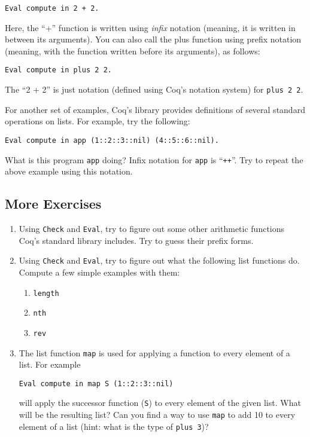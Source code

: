\documentclass{book}[12pt]
\begin{document}
\begin{verbatim}
Eval compute in 2 + 2.
\end{verbatim}

\noindent Here, the ``+'' function is written using \emph{infix}
notation (meaning, it is written in between its arguments).  You can
also call the plus function using prefix notation (meaning, with the
function written before its arguments), as follows:

\begin{verbatim}
Eval compute in plus 2 2.
\end{verbatim}

\noindent The ``2 + 2'' is just notation (defined using Coq's notation
system) for \texttt{plus 2 2}.

\noindent For another set of examples, Coq's library provides definitions
of several standard operations on lists.  For example, try the following:

\begin{verbatim}
Eval compute in app (1::2::3::nil) (4::5::6::nil).
\end{verbatim}

\noindent What is this program \texttt{app} doing?  Infix notation for
\texttt{app} is ``\texttt{++}''.  Try to repeat the above example
using this notation.

\subsection{More Exercises}

\begin{enumerate}
\item Using \texttt{Check} and \texttt{Eval}, try to figure out some
other arithmetic functions Coq's standard library includes.  Try to
guess their prefix forms.

\item Using \texttt{Check} and \texttt{Eval}, try to figure out what
the following list functions do.  Compute a few simple examples with
them:
\begin{enumerate}
\item \texttt{length}
\item \texttt{nth}
\item \texttt{rev}
\end{enumerate}
\item The list function \texttt{map} is used for applying a function
to every element of a list.  For example

\begin{verbatim}
Eval compute in map S (1::2::3::nil)
\end{verbatim}

\noindent will apply the successor function (\texttt{S}) to every element
of the given list.  What will be the resulting list?  Can you find a way
to use \texttt{map} to add 10 to every element of a list (hint: what is
the type of \texttt{plus 3})?
\end{enumerate}
\end{document}
